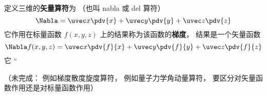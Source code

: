 

定义三维的\textbf{矢量算符}为 （也叫 nabla 或 del 算符）
\begin{equation}
\Nabla = \uvec x \pdv{x} + \uvec y \pdv{y} + \uvec z \pdv{z}
\end{equation}
它作用在标量函数 $f(x, y, z)$ 上的结果称为该函数的\textbf{梯度}， 结果是一个矢量函数
\begin{equation}
\Nabla f(x, y, z) = \uvec x \pdv{f}{x} + \uvec y \pdv{f}{y} + \uvec z \pdv{f}{z}
\end{equation}
它 “


（未完成： 例如梯度散度旋度算符， 例如量子力学角动量算符， 要区分对矢量函数作用还是对标量函数作用）
